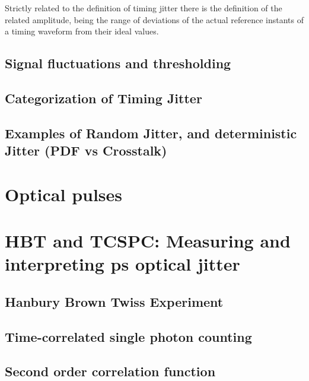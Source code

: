 Strictly related to the definition of timing jitter there is the definition of the related amplitude, being the range of deviations of 
the actual reference instants of a timing waveform from their ideal values.  

\subsection{Signal fluctuations and thresholding}
\subsection{Categorization of Timing Jitter}
\subsection{Examples of Random Jitter, and deterministic Jitter (PDF vs Crosstalk)}

\section{Optical pulses}
\label{sec:Def-Pulses}

\section{HBT and TCSPC: Measuring and interpreting ps optical jitter}
\label{sec:Def-Techniques}
\subsection{Hanbury Brown Twiss Experiment}
\subsection{Time-correlated single photon counting}
\subsection{Second order correlation function}